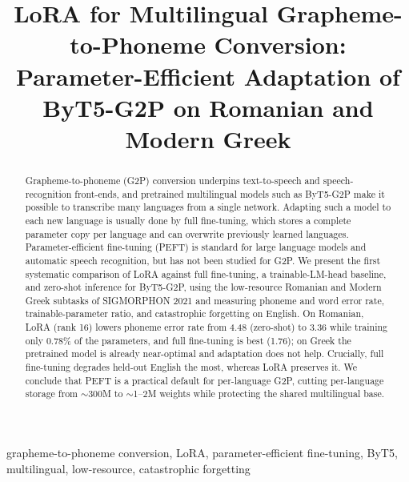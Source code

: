 \documentclass[conference]{IEEEtran}
\begin{document}
\title{LoRA for Multilingual Grapheme-to-Phoneme Conversion: Parameter-Efficient Adaptation of ByT5-G2P on Romanian and Modern Greek}

\author{
}

\maketitle

\begin{abstract}
Grapheme-to-phoneme (G2P) conversion underpins text-to-speech and speech-recognition front-ends, and pretrained multilingual models such as ByT5-G2P make it possible to transcribe many languages from a single network. Adapting such a model to each new language is usually done by full fine-tuning, which stores a complete parameter copy per language and can overwrite previously learned languages. Parameter-efficient fine-tuning (PEFT) is standard for large language models and automatic speech recognition, but has not been studied for G2P. We present the first systematic comparison of LoRA against full fine-tuning, a trainable-LM-head baseline, and zero-shot inference for ByT5-G2P, using the low-resource Romanian and Modern Greek subtasks of SIGMORPHON 2021 and measuring phoneme and word error rate, trainable-parameter ratio, and catastrophic forgetting on English. On Romanian, LoRA (rank 16) lowers phoneme error rate from 4.48 (zero-shot) to 3.36 while training only 0.78\% of the parameters, and full fine-tuning is best (1.76); on Greek the pretrained model is already near-optimal and adaptation does not help. Crucially, full fine-tuning degrades held-out English the most, whereas LoRA preserves it. We conclude that PEFT is a practical default for per-language G2P, cutting per-language storage from $\sim$300M to $\sim$1--2M weights while protecting the shared multilingual base.
\end{abstract}

\begin{IEEEkeywords}
grapheme-to-phoneme conversion, LoRA, parameter-efficient fine-tuning, ByT5, multilingual, low-resource, catastrophic forgetting
\end{IEEEkeywords}
\end{document}
